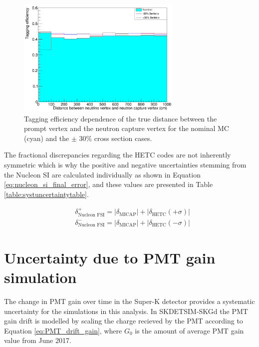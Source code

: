\begin{figure}[!htb]
\centering
    \includegraphics[width=0.7\textwidth]{Figures/hetc_han_syst.PNG}
\caption{Tagging efficiency dependence of the true distance between the prompt vertex and the neutron capture vertex for the nominal MC (cyan) and the $\pm$ 30\% cross section cases.}
\label{fig:HETC_taggeff_syst}
\end{figure}

The fractional discrepancies regarding the HETC codes are not inherently symmetric which is why the positive and negative uncertainties stemming from the Nucleon SI are calculated individually as shown in Equation \ref{eq:nucleon_si_final_error}, and these values are presented in Table \ref{table:systuncertaintytable}.

\begin{equation}
    \begin{aligned}
    & \delta_{\text{Nucleon FSI}}^{+}=\left|\delta_{\text{MICAP}}\right|+\left|\delta_{\text {HETC}}(+\sigma)\right| \\
    & \delta_{\text{Nucleon FSI}}^{-}=\left|\delta_{\text {MICAP}}\right|+\left|\delta_{\text {HETC}}(-\sigma)\right|
    \end{aligned}
    \label{eq:nucleon_si_final_error}
\end{equation}


\section{Uncertainty due to PMT gain simulation}

The change in PMT gain over time in the Super-K detector provides a systematic uncertainty for the simulations in this analysis. In SKDETSIM-SKGd the PMT gain drift is modelled by scaling the charge recieved by the PMT according to Equation \ref{eq:PMT_drift_gain}, where $G_{0}$ is the amount of average PMT gain value from June 2017. 

